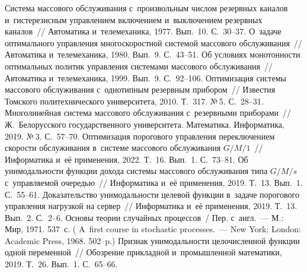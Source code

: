 \begin{multicols}{2}
{\small\frenchspacing
 {%
 \begin{thebibliography}{99}
 Сис\-те\-ма массового обслуживания с~произвольным 
числом резервных каналов и~гистерезисным управ\-ле\-ни\-ем включением 
и~выключением резервных каналов~// Автоматика и~телемеханика, 1977. 
Вып.~10. С.~30--37.
 О~задаче оптимального управления многоскоростной 
сис\-те\-мой массового обслуживания~// Автоматика и~телемеханика, 1980. 
Вып.~9. С.~43--51. 
 Об условиях монотонности оптимальных политик 
управ\-ле\-ния сис\-те\-ма\-ми массового обслуживания~// Автоматика 
и~телемеханика, 1999. Вып.~9. С.~92--106.
 Оптимизация сис\-те\-мы массового 
обслуживания с~однотипным резервным прибором~// Известия Томского 
политехнического университета, 2010. Т.~317. №\,5. С.~28--31.
 Многолинейная сис\-те\-ма массового обслуживания 
с~резервными приборами~// Ж.~Белорусского государственного 
университета. Математика. Информатика, 2019. №\,3. С.~57--70.
 Оптимизация порогового управ\-ле\-ния переключением 
ско\-рости обслуживания в~сис\-те\-ме массового обслуживания $G/M/1$~// 
Информатика и~её применения, 2022. Т.~16. Вып.~1. С.~73--81.
 Об унимодальности функции дохода 
системы массового обслуживания типа $G/M/s$ с~управ\-ля\-емой очередью~// Информатика и~её 
применения, 2019. Т.~13. Вып.~1. С.~55--61.
 Доказательство уни\-мо\-даль\-ности 
целевой функции в~задаче порогового управ\-ле\-ния нагрузкой на сервер~// 
Информатика и~её применения, 2019. Т.~13. Вып.~2. С.~2--6. 
 Основы тео\-рии случайных процессов~/ Пер. с~англ.~--- М.: 
Мир, 1971.  537~с. ( A~first course in stochastic processes.~--- New York; 
London: Academic Press, 1968. 502~p.)
 Признак унимодальности це\-ло\-чис\-лен\-ной функции 
одной переменной~// Обозрение при\-клад\-ной и~промышленной математики, 
2019. Т.~26. Вып.~1. С.~65--66.
\end{thebibliography}

 }
 }

\end{multicols}

\vspace*{-6pt}

